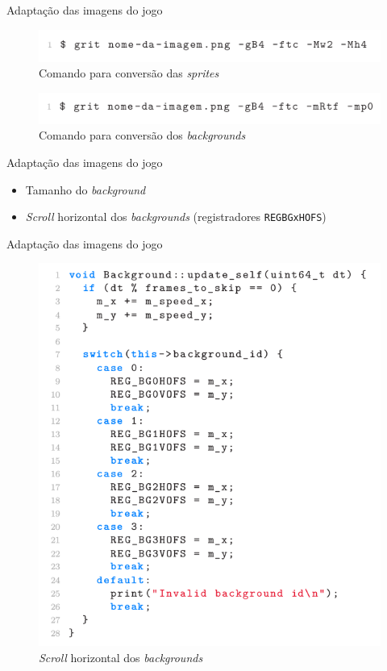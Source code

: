 \documentclass[notes, mathserif]{beamer}
\begin{document}
\begin{frame}{Adapta\c c\~ao das imagens do jogo}
	\begin{figure}[H]
		\includegraphics[width=.8\linewidth]{figuras/grit-sprite.png}
		\centering
		\caption{Comando para convers\~ao das \textit{sprites}}
		\label{fig:vsync}
	\end{figure}

	\begin{figure}[H]
		\includegraphics[width=.8\linewidth]{figuras/grit-background.png}
		\centering
		\caption{Comando para convers\~ao dos \textit{backgrounds}}
		\label{fig:vsync}
	\end{figure}
\end{frame}

\begin{frame}{Adapta\c c\~ao das imagens do jogo}
	\begin{itemize}[<+->]
		\item Tamanho do \textit{background}
		\item \textit{Scroll} horizontal dos \textit{backgrounds} (registradores \texttt{REGBGxHOFS})
	\end{itemize}
\end{frame}

\begin{frame}{Adapta\c c\~ao das imagens do jogo}
	\begin{figure}[H]
		\includegraphics[width=.5\linewidth]{figuras/bg-scroll.png}
		\centering
		\caption{\textit{Scroll} horizontal dos \textit{backgrounds}}
		\label{fig:vsync}
	\end{figure}
\end{frame}
\end{document}
